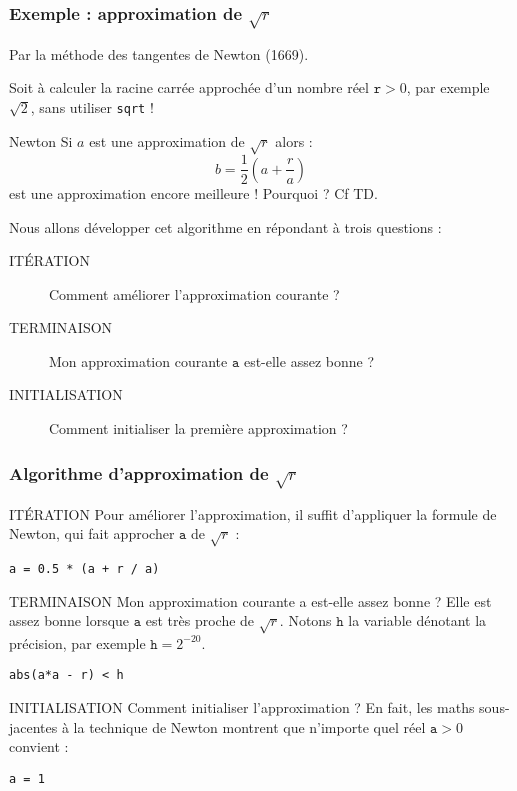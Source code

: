 \documentclass[10pt]{beamer}
\begin{document}
\begin{frame}
  \frametitle{Exemple : approximation de $\sqrt{r}$}
  Par la méthode des tangentes de Newton (1669).

  Soit à calculer la racine carrée approchée d'un nombre réel $\mathtt{r} > 0$, par exemple $\sqrt{2}$, sans utiliser \texttt{sqrt} !

  \begin{block}{Newton}
  Si $a$ est une approximation de $\sqrt{r}$ alors :
  \[
    b = \frac{1}{2}(a + \frac{r}{a})
  \]
  est une approximation encore meilleure ! Pourquoi ? Cf TD.
  \end{block}
  Nous allons développer cet algorithme en répondant à trois questions :
  \begin{description}
  \item[ITÉRATION] Comment améliorer l'approximation courante ?
  \item[TERMINAISON] Mon approximation courante $\mathtt{a}$ est-elle assez bonne ?
  \item[INITIALISATION] Comment initialiser la première approximation ?
  \end{description}
\end{frame}

\begin{frame}[fragile]
  \frametitle{Algorithme d'approximation de $\sqrt{r}$}
  \begin{block}{ITÉRATION}
    Pour \alert{améliorer} l'approximation, il suffit d'appliquer la formule de Newton, qui fait approcher $\mathtt{a}$ de $\sqrt{r}$ :
    \begin{lstlisting}[style=editor]
a = 0.5 * (a + r / a)
    \end{lstlisting}
  \end{block}

  \begin{block}{TERMINAISON}
  Mon approximation courante a est-elle \alert{assez bonne} ? Elle est assez bonne lorsque $\mathtt{a}$ est très proche de $\sqrt{r}$.
Notons $\mathtt{h}$ la variable dénotant la précision, par exemple $\mathtt{h} = 2^{-20}$.
\begin{lstlisting}[style=editor]
abs(a*a - r) < h
\end{lstlisting}
\end{block}
\begin{block}{INITIALISATION}
  Comment \alert{initialiser} l'approximation ? En fait, les maths sous-jacentes à la technique de Newton montrent que n'importe quel réel $\mathtt{a} > 0$ convient :
  \begin{lstlisting}[style=editor]
a = 1
  \end{lstlisting}
\end{block}
\end{frame}
\end{document}
